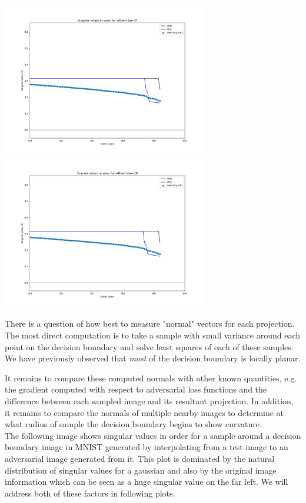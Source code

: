\includegraphics[width=9cm]{c4_figures/e03-SVD-Orthant_origin-dim-cropped9.png}
\includegraphics[width=9cm]{c4_figures/e03-SVD-Orthant_origin-dim-cropped10.png}

There is a question of how best to measure "normal" vectors for each projection. The most direct computation is to take a sample with small variance around each point on the decision boundary and solve least squares of each of these samples. We have previously observed that \emph{most} of the decision boundary is locally planar. 

It remains to compare these computed normals with other known quantities, e.g. the gradient computed with respect to adversarial loss functions and the difference between each sampled image and its resultant projection. In addition, it remains to compare the normals of multiple nearby images to determine at what radius of sample the decision boundary begins to show curvature.\\

The following image shows singular values in order for a sample around a decision boundary image in MNIST generated by interpolating from a test image to an adversarial image generated from it. This plot is dominated by the natural distribution of singular values for a gaussian and also by the original image information which can be seen as a huge singular value on the far left. We will address both of these factors in following plots. \\

